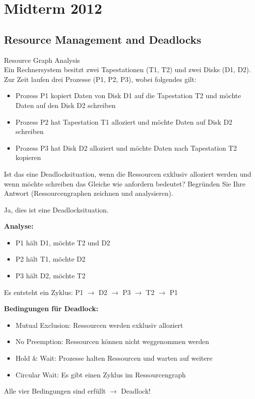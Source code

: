 \section{Midterm 2012}

\subsection{Resource Management and Deadlocks}

\begin{example2}{Resource Graph Analysis}\\
    Ein Rechnersystem besitzt zwei Tapestationen (T1, T2) und zwei Disks (D1, D2). Zur Zeit laufen drei Prozesse (P1, P2, P3), wobei folgendes gilt:
    \begin{itemize}
        \item Prozess P1 kopiert Daten von Disk D1 auf die Tapestation T2 und möchte Daten auf den Disk D2 schreiben
        \item Prozess P2 hat Tapestation T1 alloziert und möchte Daten auf Disk D2 schreiben
        \item Prozess P3 hat Disk D2 alloziert und möchte Daten nach Tapestation T2 kopieren
    \end{itemize}
    
    Ist das eine Deadlocksituation, wenn die Ressourcen exklusiv alloziert werden und wenn möchte schreiben das Gleiche wie anfordern bedeutet? Begründen Sie Ihre Antwort (Ressourcengraphen zeichnen und analysieren).
    
    \tcblower
    Ja, dies ist eine Deadlocksituation. 
    
    \textbf{Analyse:}
    \begin{itemize}
        \item P1 hält D1, möchte T2 und D2
        \item P2 hält T1, möchte D2  
        \item P3 hält D2, möchte T2
    \end{itemize}
    
    Es entsteht ein Zyklus: P1 $\rightarrow$ D2 $\rightarrow$ P3 $\rightarrow$ T2 $\rightarrow$ P1\\
    
    \textbf{Bedingungen für Deadlock:}
    \begin{itemize}
        \item Mutual Exclusion: Ressourcen werden exklusiv alloziert
        \item No Preemption: Ressourcen können nicht weggenommen werden
        \item Hold \& Wait: Prozesse halten Ressourcen und warten auf weitere
        \item Circular Wait: Es gibt einen Zyklus im Ressourcengraph
    \end{itemize}
    
    Alle vier Bedingungen sind erfüllt $\rightarrow$ Deadlock!
\end{example2}


